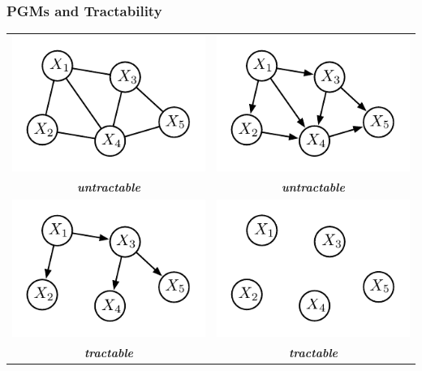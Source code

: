 \documentclass[xcolor={usenames,dvipsnames,svgnames}, compress]{beamer}
\begin{document}
\begin{frame}[t]
  \frametitle{PGMs and Tractability}
  \begin{table}[!ht]
    \setlength{\tabcolsep}{25pt}
    \centering
    \begin{tabular}{c c}
      
      \includegraphics[width=0.33\linewidth]{figures/mrf} &
                                                            \includegraphics[width=0.33\linewidth]{figures/bn}\\
      \addlinespace[-0.2cm]
      \scriptsize\color{untractable_red}  \textbf{\emph{untractable}} & \scriptsize\color{untractable_red} \textbf{\emph{untractable}} \\
      \addlinespace[0.5cm]
      \includegraphics[width=0.33\linewidth]{figures/clt} &
                                                            \includegraphics[width=0.33\linewidth]{figures/nf}\\
      \addlinespace[-0.2cm]
      \scriptsize\color{tractable_green} \emph{\textbf{tractable}} & \scriptsize\color{tractable_green} \emph{\textbf{tractable}}                                                              
    \end{tabular}
  \end{table}
\end{frame}
\end{document}
